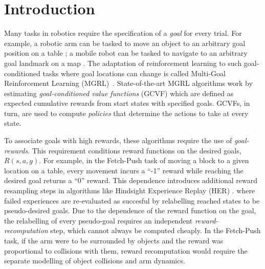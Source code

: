 \section{Introduction}

Many tasks in robotics require the specification of a \emph{goal} for every
trial. For example, a robotic arm can be tasked to move an object to an arbitrary
goal position on a table \citep{gu2017deep}; a mobile robot can be
tasked to navigate to an arbitrary goal landmark on a map \citep{zhu2017target}. The
adaptation of reinforcement learning to such goal-conditioned tasks where goal
locations can change is called Multi-Goal Reinforcement Learning
(MGRL)~\citep{plappert2018multi}.
State-of-the-art MGRL algorithms
\citep{andrychowicz2017hindsight, pong2018temporal}
work by estimating \emph{goal-conditioned value functions} (GCVF) which
are defined as expected cumulative rewards from 
start states with specified goals. GCVFs, in turn, are used to compute
\emph{policies} that determine the actions to take at every state.


To associate goals with high rewards, these algorithms require the use
of \emph{goal-rewards}.
This requirement conditions reward functions on the desired goals, $R(s,a,g)$.
For example, in the Fetch-Push task \citep{plappert2018multi} of moving
a block to a given location on a table, every movement incurs a ``-1''
reward while reaching the desired goal returns a ``0'' reward. 
This dependence introduces additional reward resampling steps in
algorithms like Hindsight Experience Replay (HER) \citep{andrychowicz2017hindsight}. 
where failed experiences are
re-evaluated as succesful by relabelling reached states to be
pseudo-desired goals. Due to the dependence of the reward function on the goal,
the relabelling of every pseudo-goal requires an independent
\emph{reward-recomputation} step, which cannot always be computed
cheaply. In the Fetch-Push task, if the arm were to be
surrounded by objects and the reward was proportional to collisions with
them, reward recomputation would require the separate modelling of
object collisions and arm dynamics. 

